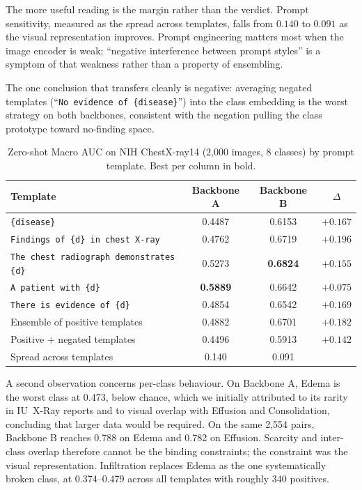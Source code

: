 \documentclass[runningheads]{llncs}
\begin{document}
The more useful reading is the margin rather than the verdict. Prompt
sensitivity, measured as the spread across templates, falls from $0.140$ to
$0.091$ as the visual representation improves. Prompt engineering matters most
when the image encoder is weak; ``negative interference between prompt styles''
is a symptom of that weakness rather than a property of ensembling.

The one conclusion that transfers cleanly is negative: averaging negated
templates (``\texttt{No evidence of \{disease\}}'') into the class embedding is
the worst strategy on both backbones, consistent with the negation pulling the
class prototype toward no-finding space.

\begin{table}[t]
\centering
\caption{Zero-shot Macro AUC on NIH ChestX-ray14 (2{,}000 images, 8 classes) by
prompt template. Best per column in bold.}
\label{tab:prompts}
\begin{tabular}{lccc}
\toprule
Template & Backbone A & Backbone B & $\Delta$ \\
\midrule
\texttt{\{disease\}}                              & 0.4487 & 0.6153 & $+0.167$ \\
\texttt{Findings of \{d\} in chest X-ray}         & 0.4762 & 0.6719 & $+0.196$ \\
\texttt{The chest radiograph demonstrates \{d\}}  & 0.5273 & \textbf{0.6824} & $+0.155$ \\
\texttt{A patient with \{d\}}                     & \textbf{0.5889} & 0.6642 & $+0.075$ \\
\texttt{There is evidence of \{d\}}               & 0.4854 & 0.6542 & $+0.169$ \\
Ensemble of positive templates                    & 0.4882 & 0.6701 & $+0.182$ \\
Positive $+$ negated templates                    & 0.4496 & 0.5913 & $+0.142$ \\
\midrule
Spread across templates                           & 0.140  & 0.091  & \\
\bottomrule
\end{tabular}
\end{table}

A second observation concerns per-class behaviour. On Backbone A, Edema is the
worst class at 0.473, below chance, which we initially attributed to its rarity
in IU~X-Ray reports and to visual overlap with Effusion and Consolidation,
concluding that larger data would be required. On the same 2{,}554 pairs,
Backbone B reaches 0.788 on Edema and 0.782 on Effusion. Scarcity and inter-class
overlap therefore cannot be the binding constraints; the constraint was the
visual representation. Infiltration replaces Edema as the one systematically
broken class, at 0.374--0.479 across all templates with roughly 340 positives.
\end{document}
